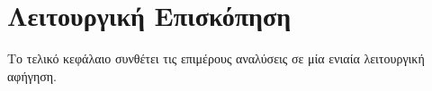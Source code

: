 \chapter{ Λειτουργική Επισκόπηση}
\label{ch:end_to_end_overview}

Το τελικό κεφάλαιο συνθέτει τις επιμέρους αναλύσεις σε μία ενιαία λειτουργική αφήγηση.



